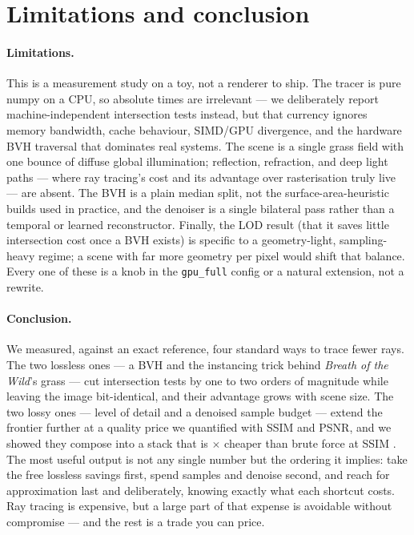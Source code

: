 \section{Limitations and conclusion}
\label{sec:conclusion}

\paragraph{Limitations.} This is a measurement study on a toy, not a renderer to
ship. The tracer is pure numpy on a CPU, so absolute times are irrelevant --- we
deliberately report machine-independent intersection tests instead, but that
currency ignores memory bandwidth, cache behaviour, SIMD/GPU divergence, and the
hardware BVH traversal that dominates real systems. The scene is a single grass
field with one bounce of diffuse global illumination; reflection, refraction,
and deep light paths --- where ray tracing's cost and its advantage over
rasterisation truly live --- are absent. The BVH is a plain median split, not the
surface-area-heuristic builds used in practice, and the denoiser is a single
bilateral pass rather than a temporal or learned reconstructor. Finally, the LOD
result (that it saves little intersection cost once a BVH exists) is specific to
a geometry-light, sampling-heavy regime; a scene with far more geometry per pixel
would shift that balance. Every one of these is a knob in the \texttt{gpu\_full}
config or a natural extension, not a rewrite.

\paragraph{Conclusion.} We measured, against an exact reference, four standard
ways to trace fewer rays. The two lossless ones --- a BVH and the instancing
trick behind \emph{Breath of the Wild}'s grass --- cut intersection tests by one
to two orders of magnitude while leaving the image bit-identical, and their
advantage grows with scene size. The two lossy ones --- level of detail and a
denoised sample budget --- extend the frontier further at a quality price we
quantified with SSIM and PSNR, and we showed they compose into a stack that is
\StackSpeedup$\times$ cheaper than brute force at SSIM \StackSsim. The most
useful output is not any single number but the ordering it implies: take the free
lossless savings first, spend samples and denoise second, and reach for
approximation last and deliberately, knowing exactly what each shortcut costs.
Ray tracing is expensive, but a large part of that expense is avoidable without
compromise --- and the rest is a trade you can price.
